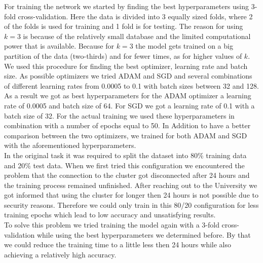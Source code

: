 \documentclass{tubaf-article}
\begin{document}
	For training the network we started by finding the best hyperparameters using 3-fold cross-validation. Here the data is divided into 3 equally sized folds, where 2 of the folds is used for training and 1 fold is for testing. The reason for using $k=3$ is because of the relatively small database and the limited computational power that is available. Because for $k=3$ the model gets trained on a big partition of the data (two-thirds) and for fewer times, as for higher values of $k$. We used this procedure for finding the best optimizer, learning rate and batch size. As possible optimizers we tried ADAM and SGD and several combinations of different learning rates from 0.0005 to 0.1 with batch sizes between 32 and 128. As a result we got as best hyperparameters for the ADAM optimizer a learning rate of 0.0005 and batch size of 64. For SGD we got a learning rate of 0.1 with a batch size of 32. For the actual training we used these hyperparameters in combination with a number of epochs equal to 50. In Addition to have a better comparison between the two optimizers, we trained for both ADAM and SGD with the aforementioned hyperparameters. \\
	In the original task it was required to split the dataset into 80\% training data and 20\% test data. When we first tried this configuration we encountered the problem that the connection to the cluster got disconnected after 24 hours and the training process remained unfinished. After reaching out to the University we got informed that using the cluster for longer then 24 hours is not possible due to security reasons. Therefore we could only train in this 80/20 configuration for less training epochs which lead to low accuracy and unsatisfying results. \\
	To solve this problem we tried training the model again with a 3-fold cross-validation while using the best hyperparameters we determined before. By that we could reduce the training time to a little less then 24 hours while also achieving a relatively high accuracy.
	
\end{document}
